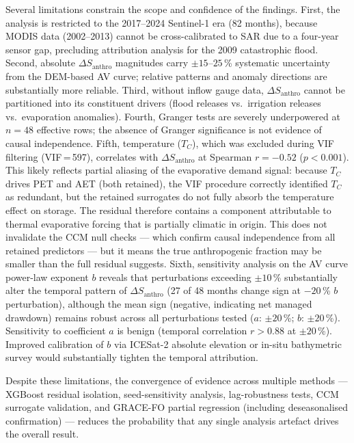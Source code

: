 \documentclass[preprint,12pt,authoryear]{elsarticle}
\newcommand{\dSanthro}{\Delta S_{\mathrm{anthro}}}
\begin{document}
Several limitations constrain the scope and confidence of the findings.
First, the analysis is restricted to the 2017--2024 Sentinel-1 era (82
months), because MODIS data (2002--2013) cannot be cross-calibrated to SAR
due to a four-year sensor gap, precluding attribution analysis for the 2009
catastrophic flood. Second, absolute $\dSanthro$ magnitudes carry
$\pm 15$--$25$\,\% systematic uncertainty from the DEM-based AV curve; relative
patterns and anomaly directions are substantially more reliable. Third, without
inflow gauge data, $\dSanthro$ cannot be partitioned into its constituent
drivers (flood releases vs.\ irrigation releases vs.\ evaporation anomalies).
Fourth, Granger tests are severely underpowered at $n = 48$ effective rows; the
absence of Granger significance is not evidence of causal independence.
Fifth, temperature ($T_C$), which was excluded during VIF filtering
(VIF\,=\,597), correlates with $\dSanthro$ at Spearman $r = -0.52$
($p < 0.001$). This likely reflects partial aliasing of the evaporative demand
signal: because $T_C$ drives PET and AET (both retained), the VIF procedure
correctly identified $T_C$ as redundant, but the retained surrogates do not
fully absorb the temperature effect on storage. The residual therefore contains
a component attributable to thermal evaporative forcing that is partially
climatic in origin. This does not invalidate the CCM null checks --- which
confirm causal independence from all retained predictors --- but it means the
true anthropogenic fraction may be smaller than the full residual suggests.
Sixth, sensitivity analysis on the AV curve power-law exponent $b$ reveals
that perturbations exceeding $\pm 10$\,\% substantially alter the temporal
pattern of $\dSanthro$ (27 of 48 months change sign at $-20$\,\% $b$
perturbation), although the mean sign (negative, indicating net managed
drawdown) remains robust across all perturbations tested ($a$: $\pm 20$\,\%;
$b$: $\pm 20$\,\%). Sensitivity to coefficient $a$ is benign (temporal
correlation $r > 0.88$ at $\pm 20$\,\%). Improved calibration of $b$ via
ICESat-2 absolute elevation or in-situ bathymetric survey would substantially
tighten the temporal attribution.

Despite these limitations, the convergence of evidence across multiple
methods --- XGBoost residual isolation, seed-sensitivity analysis,
lag-robustness tests, CCM surrogate validation, and GRACE-FO partial
regression (including deseasonalised confirmation) --- reduces the probability
that any single analysis artefact drives the overall result.
\end{document}
